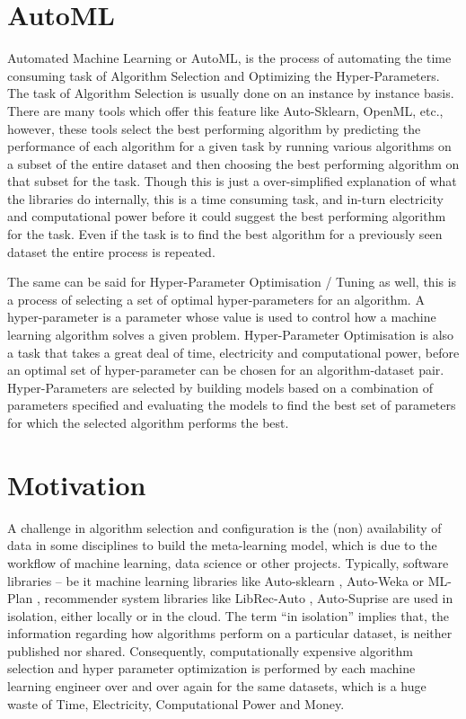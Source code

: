 \section{AutoML}
Automated Machine Learning or AutoML, is the process of automating the time consuming task of Algorithm Selection and Optimizing the Hyper-Parameters. The task of Algorithm Selection is usually done on an instance by instance basis. There are many tools which offer this feature like Auto-Sklearn, OpenML, etc., however, these tools select the best performing algorithm by predicting the performance of each algorithm for a given task by running various algorithms on a subset of the entire dataset and then choosing the best performing algorithm on that subset for the task. Though this is just a over-simplified explanation of what the libraries do internally, this is a time consuming task, and in-turn electricity and computational power before it could suggest the best performing algorithm for the task. Even if the task is to find the best algorithm for a previously seen dataset the entire process is repeated.

The same can be said for Hyper-Parameter Optimisation / Tuning as well, this is a process of selecting a set of optimal hyper-parameters for an algorithm. A hyper-parameter is a parameter whose value is used to control how a machine learning algorithm solves a given problem. Hyper-Parameter Optimisation is also a task that takes a great deal of time, electricity and computational power, before an optimal set of hyper-parameter can be chosen for an algorithm-dataset pair. Hyper-Parameters are selected by building models based on a combination of parameters specified and evaluating the models to find the best set of parameters for which the selected algorithm performs the best.

\section{Motivation}
A challenge in algorithm selection and configuration is the (non) availability of data in some disciplines to build the meta-learning model, which is due to the workflow of machine learning, data science or other projects. Typically, software libraries – be it machine learning libraries like Auto-sklearn \citep{feurer:m}, Auto-Weka \citep{kotthoff:l} or ML-Plan \citep{mohr:f}, recommender system libraries like LibRec-Auto \citep{mansoury:m}, Auto-Suprise \citep{rohan-joeran} are used in isolation, either locally or in the cloud. The term “in isolation” implies that, the information regarding how algorithms perform on a particular dataset, is neither published nor shared. Consequently, computationally expensive algorithm selection and hyper parameter optimization is performed by each machine learning engineer over and over again for the same datasets, which is a huge waste of Time, Electricity, Computational Power and Money.

